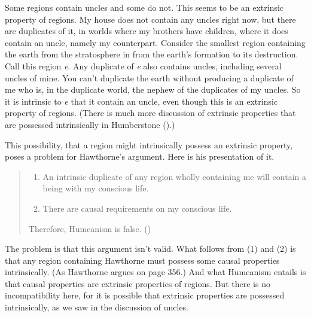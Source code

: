 \documentclass[
  11pt,
  letterpaper,
  DIV=11,
  numbers=noendperiod,
  twoside]{scrartcl}
\providecommand{\tightlist}{%
  \setlength{\itemsep}{0pt}\setlength{\parskip}{0pt}}
\begin{document}
Some regions contain uncles and some do not. This seems to be an
extrinsic property of regions. My house does not contain any uncles
right now, but there are duplicates of it, in worlds where my brothers
have children, where it does contain an uncle, namely my counterpart.
Consider the smallest region containing the earth from the stratosphere
in from the earth's formation to its destruction. Call this region
\emph{e}. Any duplicate of \emph{e} also contains uncles, including
several uncles of mine. You can't duplicate the earth without producing
a duplicate of me who is, in the duplicate world, the nephew of the
duplicates of my uncles. So it is intrinsic to \emph{e} that it contain
an uncle, even though this is an extrinsic property of regions. (There
is much more discussion of extrinsic properties that are possessed
intrinsically in Humberstone ().)

This possibility, that a region might intrinsically possess an extrinsic
property, poses a problem for Hawthorne's argument. Here is his
presentation of it.

\begin{quote}
\begin{enumerate}
\def\labelenumi{\arabic{enumi}.}
\tightlist
\item
  An intrinsic duplicate of any region wholly containing me will contain
  a being with my conscious life.
\item
  There are causal requirements on my conscious life.
\end{enumerate}

Therefore, Humeanism is false.
()
\end{quote}

The problem is that this argument isn't valid. What follows from (1) and
(2) is that any region containing Hawthorne must possess some causal
properties intrinsically. (As Hawthorne argues on page 356.) And what
Humeanism entails is that causal properties are extrinsic properties of
regions. But there is no incompatibility here, for it is possible that
extrinsic properties are possessed intrinsically, as we saw in the
discussion of uncles.
\end{document}

